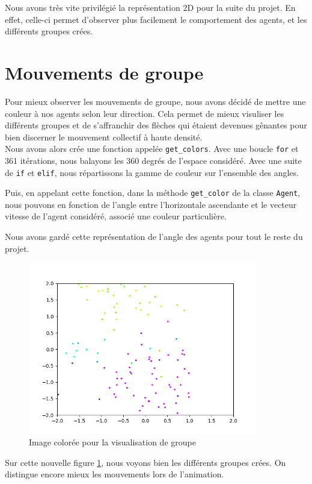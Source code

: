 \documentclass[french, a4paper, 12pt, openany]{report}
\begin{document}
   Nous avons très vite privilégié la représentation 2D pour la suite du projet. En effet, celle-ci permet d'observer plus facilement le comportement des agents, et les différents groupes crées. 
   
   
\section{Mouvements de groupe}

   Pour mieux observer les mouvements de groupe, nous avons décidé de mettre une couleur à nos agents selon leur direction. Cela permet de mieux visuliser les différents groupes et de s'affranchir des flèches qui étaient devenues gênantes pour bien discerner le mouvement collectif à haute densité.\\
   
   Nous avons alors crée une fonction appelée \verb|get_colors|. Avec une boucle \verb|for| et 361 itérations, nous balayons les 360 degrés de l'espace considéré. Avec une suite de \verb|if| et \verb|elif|, nous répartissons la gamme de couleur sur l'ensemble des angles.
   
   Puis, en appelant cette fonction, dans la méthode \verb|get_color| de la classe \verb|Agent|, nous pouvons en fonction de l'angle entre l'horizontale ascendante et le vecteur vitesse de l'agent considéré, associé une couleur particulière.
 
   Nous avons gardé cette représentation de l'angle des agents pour tout le reste du projet.
   \begin{figure}[!h]
		\centering
		\includegraphics[width=10cm]{images/image_6.png}
		\caption{Image colorée pour la visualisation de groupe}
		\label{couleurs_image}
	\end{figure}  
   
   Sur cette nouvelle figure \ref{couleurs_image}, nous voyons bien les différents groupes crées. On distingue encore mieux les mouvements lors de l'animation.\\
   
\end{document}

